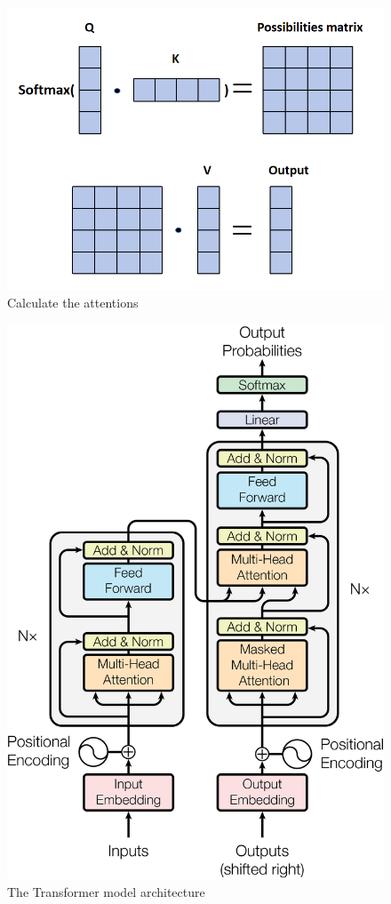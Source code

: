   \begin{figure}[!htbp]
    \centering
    \includegraphics[width=0.6\linewidth]{example_images/AttenCalculation}
    \caption{Calculate the attentions}
    \label{Calculate the attentions}
  \end{figure}
  \begin{figure}[!htbp]
    \centering
    \includegraphics[width=0.6\linewidth]{example_images/transformer}
    \caption{The Transformer model architecture\cite{NIPS2017_3f5ee243}}
    \label{The Transformer model architecture}
  \end{figure}
